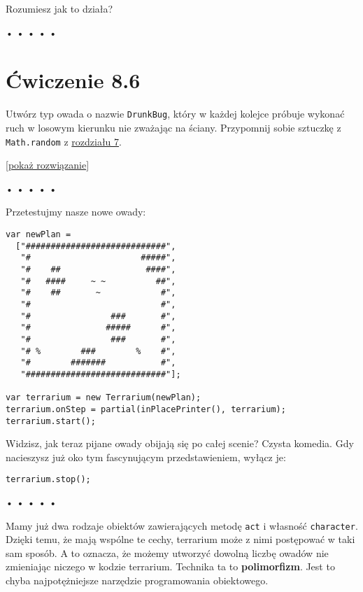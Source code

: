 Rozumiesz jak to działa?



\begin{center}
• • • • •
\end{center}

  
\section*{Ćwiczenie 8.6}
\label{sec:8.6}
  
    
Utwórz typ owada o nazwie \texttt{DrunkBug}, który w każdej kolejce próbuje wykonać ruch w losowym kierunku nie zważając na ściany. Przypomnij sobie sztuczkę z \texttt{Math.random} z \hyperref[chap:7]{rozdziału 7}.

  
[\hyperref[sol:8.6]{pokaż rozwiązanie}]
  


\begin{center}
• • • • •
\end{center}

  
Przetestujmy nasze nowe owady:

  
\begin{verbatim} 
var newPlan =
  ["############################",
   "#                      #####",
   "#    ##                 ####",
   "#   ####     ~ ~          ##",
   "#    ##       ~            #",
   "#                          #",
   "#                ###       #",
   "#               #####      #",
   "#                ###       #",
   "# %        ###        %    #",
   "#        #######           #",
   "############################"];

var terrarium = new Terrarium(newPlan);
terrarium.onStep = partial(inPlacePrinter(), terrarium);
terrarium.start();
 \end{verbatim}
  
Widzisz, jak teraz pijane owady obijają się po całej scenie? Czysta komedia. Gdy nacieszysz już oko tym fascynującym przedstawieniem, wyłącz je:

  
\begin{verbatim} 
terrarium.stop();
 \end{verbatim}


\begin{center}
• • • • •
\end{center}

  
Mamy już dwa rodzaje obiektów zawierających metodę \texttt{act} i własność \texttt{character}. Dzięki temu, że mają wspólne te cechy, terrarium może z nimi postępować w taki sam sposób. A to oznacza, że możemy utworzyć dowolną liczbę owadów nie zmieniając niczego w kodzie terrarium. Technika ta to \textbf{polimorfizm}. Jest to chyba najpotężniejsze narzędzie programowania obiektowego.

